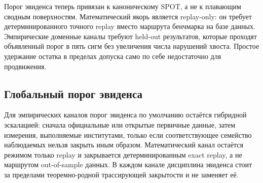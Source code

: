 Порог эвиденса теперь привязан к каноническому SPOT, а не к плавающим сводным поверхностям. Математический якорь является replay-only: он требует детерминированного точного replay вместо маршрута бенчмарка на базе данных. Эмпирические доменные каналы требуют held-out результатов, которые проходят объявленный порог в пять сигм без увеличения числа нарушений хвоста. Простое удержание остатка в пределах допуска само по себе недостаточно для продвижения.

\subsection{Глобальный порог эвиденса}
Для эмпирических каналов порог эвиденса по умолчанию остаётся гибридной эскалацией: сначала официальные или открытые первичные данные, затем измерения, выполняемые институтами, только если соответствующее семейство наблюдаемых нельзя закрыть иным образом. Математический канал остаётся режимом только replay и закрывается детерминированным exact replay, а не маршрутом out-of-sample данных. В каждом канале дисциплина эвиденса стоит за пределами теоремно-родной трассирующей закрытости и не заменяет её.


